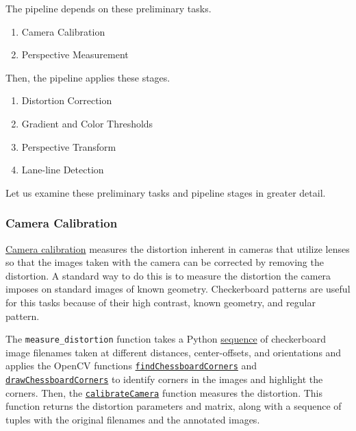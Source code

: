\documentclass[11pt]{article}
\begin{document}
The pipeline depends on these preliminary tasks.

\begin{enumerate}
\item Camera Calibration
\item Perspective Measurement
\end{enumerate}

Then, the pipeline applies these stages.

\begin{enumerate}
\item Distortion Correction
\item Gradient and Color Thresholds
\item Perspective Transform
\item Lane-line Detection
\end{enumerate}

Let us examine these preliminary tasks and pipeline stages in
greater detail.

\subsubsection*{Camera Calibration}
\label{sec-2-2-1}

\href{http://docs.opencv.org/2.4/modules/calib3d/doc/camera_calibration_and_3d_reconstruction.html}{Camera calibration} measures the distortion inherent in cameras
that utilize lenses so that the images taken with the camera can
be corrected by removing the distortion.  A standard way to do
this is to measure the distortion the camera imposes on standard
images of known geometry.  Checkerboard patterns are useful for
this tasks because of their high contrast, known geometry, and
regular pattern.

The \texttt{measure\_distortion} function takes a Python \href{https://docs.python.org/2/library/stdtypes.html#sequence-types-str-unicode-list-tuple-bytearray-buffer-xrange}{sequence} of
checkerboard image filenames taken at different distances,
center-offsets, and orientations and applies the OpenCV
functions \href{http://docs.opencv.org/2.4/modules/calib3d/doc/camera_calibration_and_3d_reconstruction.html#findchessboardcorners}{\texttt{findChessboardCorners}} and \href{http://docs.opencv.org/2.4/modules/calib3d/doc/camera_calibration_and_3d_reconstruction.html#drawchessboardcorners}{\texttt{drawChessboardCorners}} to
identify corners in the images and highlight the corners.  Then,
the \href{http://docs.opencv.org/2.4/modules/calib3d/doc/camera_calibration_and_3d_reconstruction.html#calibratecamera}{\texttt{calibrateCamera}} function measures the distortion.  This
function returns the distortion parameters and matrix, along
with a sequence of tuples with the original filenames and the
annotated images.
\end{document}
